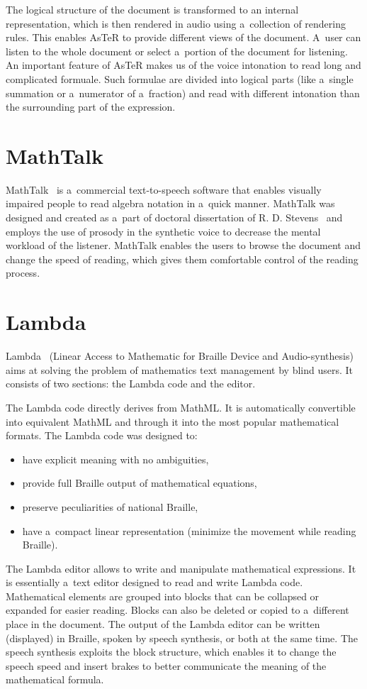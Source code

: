 \documentclass[11pt,oneside,final]{fithesis2}
\begin{document}
The logical structure of the document is transformed to an internal representation, which is then rendered in audio using a~collection of rendering rules. This enables AsTeR to provide different views of the document. A~user can listen to the whole document or select a~portion of the document for listening. An important feature of AsTeR makes us of the voice intonation to read long and complicated formuale. Such formulae are divided into logical parts (like a~single summation or a~numerator of a~fraction) and read with different intonation than the surrounding part of the expression. 

\section{MathTalk}
MathTalk~\cite{mathtalk:stevens1994mathtalk} is a~commercial text-to-speech software that enables visually impaired people to read algebra notation in a~quick manner. MathTalk was designed and created as a~part of doctoral dissertation of R. D. Stevens~\cite{mathtalk:stevens1996principles} and employs the use of prosody in the synthetic voice to decrease the mental workload of the listener. MathTalk enables the users to browse the document and change the speed of reading, which gives them comfortable control of the reading process.

\section{Lambda}
Lambda~\cite{lambda:schweikhardt2006lambda} (Linear Access to Mathematic for Braille Device and Audio-synthesis) aims at solving the problem of mathematics text management by blind users. It consists of two sections: the Lambda code and the editor.

The Lambda code directly derives from MathML. It is automatically convertible into equivalent MathML and through it into the most popular mathematical formats. The Lambda code was designed to:
\begin{itemize}
\item have explicit meaning with no ambiguities,
\item provide full Braille output of mathematical equations,
\item preserve peculiarities of national Braille,
\item have a~compact linear representation (minimize the movement while reading Braille).
\end{itemize}
The Lambda editor allows to write and manipulate mathematical expressions. It is essentially a~text editor designed to read and write Lambda code. Mathematical elements are grouped into blocks that can be collapsed or expanded for easier reading. Blocks can also be deleted or copied to a~different place in the document. The output of the Lambda editor can be written (displayed) in Braille, spoken by speech synthesis, or both at the same time. The speech synthesis exploits the block structure, which enables it to change the speech speed and insert brakes to better communicate the meaning of the mathematical formula. 
\end{document}
